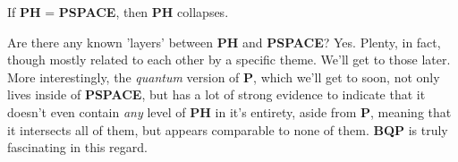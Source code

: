 \begin{fact}
    If \textbf{PH} = \textbf{PSPACE}, then \textbf{PH} collapses.
\end{fact}
Are there any known 'layers' between \textbf{PH} and \textbf{PSPACE}? Yes. Plenty, in fact, though mostly related to each other by a specific theme. We'll get to those later. More interestingly, the \textit{quantum} version of \textbf{P}, which we'll get to soon, not only lives inside of \textbf{PSPACE}, but has a lot of strong evidence to indicate that it doesn't even contain \textit{any} level of \textbf{PH} in it's entirety, aside from \textbf{P}, meaning that it intersects all of them, but appears comparable to none of them. \textbf{BQP} is truly fascinating in this regard.

